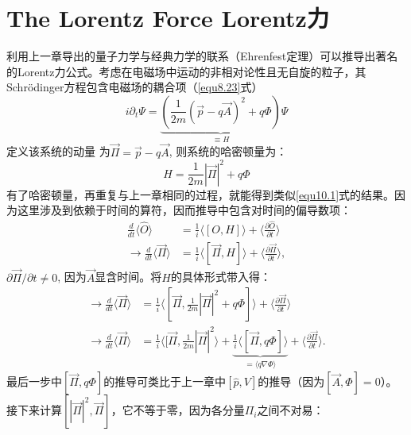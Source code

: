 \section[Lorentz力]{The Lorentz Force \quad Lorentz力}
\label{sec11.2}
利用上一章导出的量子力学与经典力学的联系（Ehrenfest定理）可以推导出著名的Lorentz力公式。考虑在电磁场中运动的非相对论性且无自旋的粒子，其Schr\"{o}dinger方程包含电磁场的耦合项（\eqref{equ8.23}式）%
\begin{equation}
\label{equ11.18}
    i \partial_t \Psi = \underbrace{ \left( \frac{1}{2m} (\vec{p} - q\vec{A})^2 + q \Phi \right)}_{\equiv H} \Psi
\end{equation}
定义该系统的动量%
%
为$\vec{\Pi} = \vec{p} - q \vec{A}$, 则系统的哈密顿量为：
\begin{equation*}
    H = \frac{1}{2m} |\vec{\Pi}|^2 + q \Phi
\end{equation*}
有了哈密顿量，再重复与上一章相同的过程，就能得到类似\eqref{equ10.1}式的结果。因为这里涉及到依赖于时间的算符，因而推导中包含对时间的偏导数项：
\begin{align*}
    \frac{d}{dt} \langle \hat{O} \rangle &= \frac{1}{i} \langle [O, H] \rangle + \langle \frac{\partial \hat{O}}{\partial t} \rangle \\
    \to \frac{d}{dt} \langle \vec{\Pi} \rangle &= \frac{1}{i} \langle [\vec{\Pi}, H] \rangle + \langle \frac{\partial \vec{\Pi}}{\partial t} \rangle,
\end{align*}
$\partial \vec{\Pi} / \partial t \neq 0$, 因为$\vec{A}$显含时间。将$H$的具体形式带入得：
\begin{align*}
    \to \frac{d}{dt} \langle \vec{\Pi} \rangle &= \frac{1}{i} \langle [\vec{\Pi}, \frac{1}{2m} |\vec{\Pi}|^2 + q \Phi] \rangle + \langle \frac{\partial \vec{\Pi}}{\partial t} \rangle \\
    \to \frac{d}{dt} \langle \vec{\Pi} \rangle &= \frac{1}{i} \langle [\vec{\Pi}, \frac{1}{2m} |\vec{\Pi}|^2 \rangle + \underbrace{ \frac{1}{i} \langle [\vec{\Pi}, q\Phi] \rangle }_{ = \langle q \nabla \Phi \rangle } + \langle \frac{\partial \vec{\Pi}}{\partial t} \rangle .
\end{align*}
最后一步中$[\vec{\Pi}, q\Phi]$的推导可类比于上一章中$[\hat{p}, V]$的推导（因为$[\vec{A}, \Phi] = 0$）。接下来计算$[|\vec{\Pi}|^2, \vec{\Pi}]$，它不等于零，因为各分量$\Pi_i$之间不对易：
